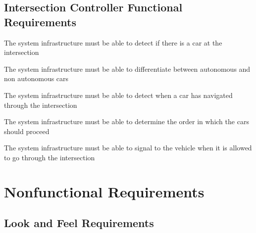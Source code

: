 \documentclass [12pt]{article}
\begin{document}
\subsection{Intersection Controller Functional Requirements}
\begin{ITC}
\setlength{\itemindent}{.5in}
	\itemsep0pt 
	\item The system infrastructure must be able to detect if there is a car at the intersection
	
	\item The system infrastructure must be able to differentiate between autonomous and non autonomous cars
	
	\item The system infrastructure must be able to detect when a car has navigated through the intersection

    \item The system infrastructure must be able to determine the order in which the cars should proceed
    
    \item The system infrastructure must be able to signal to the vehicle when it is allowed to go through the intersection
\end{ITC}




%
%



\section {Nonfunctional Requirements} 



\subsection {Look and Feel Requirements}
\end{document}
